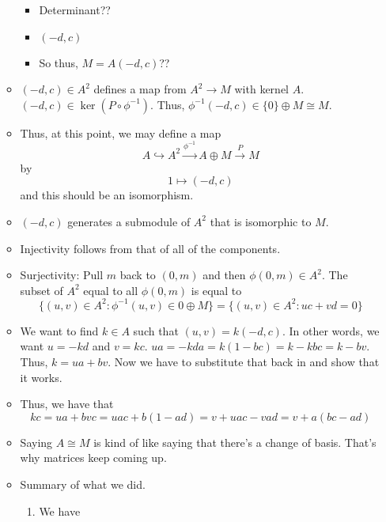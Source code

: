 \documentclass[../notes.tex]{subfiles}
\begin{document}
\begin{itemize}
\begin{itemize}
        \begin{itemize}
            \item Determinant??
            \item $(-d,c)$
            \item So thus, $M=A(-d,c)$??
        \end{itemize}
        \item $(-d,c)\in A^2$ defines a map from $A^2\to M$ with kernel $A$. $(-d,c)\in\ker(P\circ\phi^{-1})$. Thus, $\phi^{-1}(-d,c)\in\{0\}\oplus M\cong M$.
        \item Thus, at this point, we may define a map
        \begin{equation*}
            A\hookrightarrow A^2\xrightarrow{\phi^{-1}}A\oplus M\xrightarrow{P}M
        \end{equation*}
        by
        \begin{equation*}
            1\mapsto(-d,c)
        \end{equation*}
        and this should be an isomorphism.
        \item $(-d,c)$ generates a submodule of $A^2$ that is isomorphic to $M$.
        \item Injectivity follows from that of all of the components.
        \item Surjectivity: Pull $m$ back to $(0,m)$ and then $\phi(0,m)\in A^2$. The subset of $A^2$ equal to all $\phi(0,m)$ is equal to
        \begin{equation*}
            \{(u,v)\in A^2:\phi^{-1}(u,v)\in 0\oplus M\} = \{(u,v)\in A^2:uc+vd=0\}
        \end{equation*}
        \item We want to find $k\in A$ such that $(u,v)=k(-d,c)$. In other words, we want $u=-kd$ and $v=kc$. $ua=-kda=k(1-bc)=k-kbc=k-bv$. Thus, $k=ua+bv$. Now we have to substitute that back in and show that it works.
        \item Thus, we have that
        \begin{equation*}
            kc = ua+bvc
            = uac+b(1-ad)
            = v+uac-vad
            = v+a(bc-ad)
        \end{equation*}
        \item Saying $A\cong M$ is kind of like saying that there's a change of basis. That's why matrices keep coming up.
        \item Summary of what we did.
        \begin{enumerate}
            \item We have

\end{enumerate}
\end{itemize}
\end{itemize}
\end{document}
